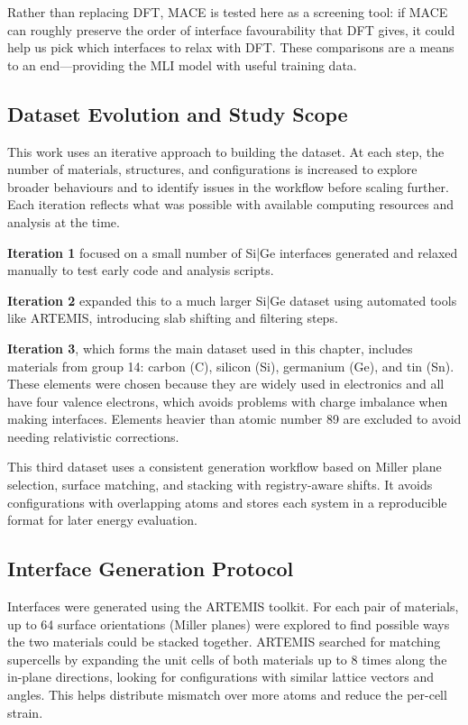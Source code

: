Rather than replacing DFT, MACE is tested here as a screening tool: if MACE can roughly preserve the order of interface favourability that DFT gives, it could help us pick which interfaces to relax with DFT. These comparisons are a means to an end—providing the MLI model with useful training data.

\subsection{Dataset Evolution and Study Scope}

This work uses an iterative approach to building the dataset. At each step, the number of materials, structures, and configurations is increased to explore broader behaviours and to identify issues in the workflow before scaling further. Each iteration reflects what was possible with available computing resources and analysis at the time.

\textbf{Iteration 1} focused on a small number of Si|Ge interfaces generated and relaxed manually to test early code and analysis scripts.

\textbf{Iteration 2} expanded this to a much larger Si|Ge dataset using automated tools like ARTEMIS, introducing slab shifting and filtering steps.

\textbf{Iteration 3}, which forms the main dataset used in this chapter, includes materials from group 14: carbon (C), silicon (Si), germanium (Ge), and tin (Sn). These elements were chosen because they are widely used in electronics and all have four valence electrons, which avoids problems with charge imbalance when making interfaces. Elements heavier than atomic number 89 are excluded to avoid needing relativistic corrections.

This third dataset uses a consistent generation workflow based on Miller plane selection, surface matching, and stacking with registry-aware shifts. It avoids configurations with overlapping atoms and stores each system in a reproducible format for later energy evaluation.

\subsection{Interface Generation Protocol}

Interfaces were generated using the ARTEMIS toolkit. For each pair of materials, up to 64 surface orientations (Miller planes) were explored to find possible ways the two materials could be stacked together. ARTEMIS searched for matching supercells by expanding the unit cells of both materials up to 8 times along the in-plane directions, looking for configurations with similar lattice vectors and angles. This helps distribute mismatch over more atoms and reduce the per-cell strain.

